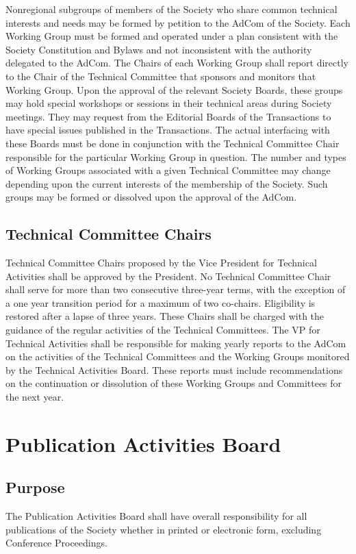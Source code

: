 \documentclass[10pt]{article}
\begin{document}
Nonregional subgroups of members of the Society who share common technical interests and needs may be formed by petition to the AdCom of the Society. Each Working Group must be formed and operated under a plan consistent with the Society Constitution and Bylaws and not inconsistent with the authority delegated to the AdCom. The Chairs of each Working Group shall report directly to the Chair of the Technical Committee that sponsors and monitors that Working Group.  Upon the approval of the relevant Society Boards, these groups may hold special workshops or sessions in their technical areas during Society meetings. They may request from the Editorial Boards of the Transactions to have special issues published in the Transactions. The actual interfacing with these Boards must be done in conjunction with the Technical Committee Chair responsible for the particular Working Group in question. The number and types of Working Groups associated with a given Technical Committee may change depending upon the current interests of the membership of the Society.  Such groups may be formed or dissolved upon the approval of the AdCom.


\subsection{Technical Committee Chairs}

Technical Committee Chairs proposed by the Vice President for Technical Activities shall be approved by the President. No Technical Committee Chair shall serve for more than two consecutive three-year terms, with the exception of a one year transition period for a maximum of two co-chairs. Eligibility is restored after a lapse of three years. These Chairs shall be charged with the guidance of the regular activities of the Technical Committees. The VP for Technical Activities shall be responsible for making yearly reports to the AdCom on the activities of the Technical Committees and the Working Groups monitored by the Technical Activities Board. These reports must include recommendations on the continuation or dissolution of these Working Groups and Committees for the next year.


\section{Publication Activities Board}
\label{PAB}

\subsection{Purpose}
The Publication Activities Board shall have overall responsibility for all publications of the Society whether in printed or electronic form, excluding Conference Proceedings.  
\end{document}
